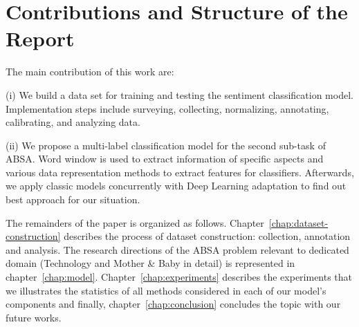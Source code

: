 \section{Contributions and Structure of the Report}
The main contribution of this work are:

(i) We build a data set for training and testing the sentiment classification model. Implementation steps include surveying, collecting, normalizing, annotating, calibrating, and analyzing data.

(ii) We propose a multi-label classification model for the second sub-task of ABSA. Word window is used to extract information of specific aspects and various data representation methods to extract features for classifiers. Afterwards, we apply classic models concurrently with Deep Learning adaptation to find out best approach for our situation.

The remainders of the paper is organized as follows. Chapter~\ref{chap:dataset-construction} describes the process of dataset construction: collection, annotation and analysis. The research directions of the ABSA problem relevant to dedicated domain (Technology and Mother \& Baby in detail) is represented in chapter~\ref{chap:model}. Chapter~\ref{chap:experiments} describes the experiments that we illustrates the statistics of all methods considered in each of our model's components and finally, chapter~\ref{chap:conclusion} concludes the topic with our future works.